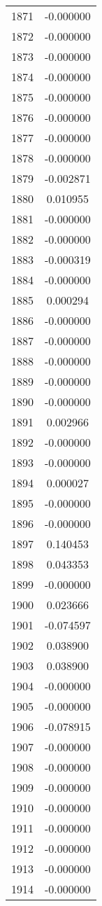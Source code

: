 \documentclass[12pt]{article}
\begin{document}
\begin{longtable}{@{}cc@{}}
1871 & -0.000000 \\
1872 & -0.000000 \\
1873 & -0.000000 \\
1874 & -0.000000 \\
1875 & -0.000000 \\
1876 & -0.000000 \\
1877 & -0.000000 \\
1878 & -0.000000 \\
1879 & -0.002871 \\
1880 & 0.010955 \\
1881 & -0.000000 \\
1882 & -0.000000 \\
1883 & -0.000319 \\
1884 & -0.000000 \\
1885 & 0.000294 \\
1886 & -0.000000 \\
1887 & -0.000000 \\
1888 & -0.000000 \\
1889 & -0.000000 \\
1890 & -0.000000 \\
1891 & 0.002966 \\
1892 & -0.000000 \\
1893 & -0.000000 \\
1894 & 0.000027 \\
1895 & -0.000000 \\
1896 & -0.000000 \\
1897 & 0.140453 \\
1898 & 0.043353 \\
1899 & -0.000000 \\
1900 & 0.023666 \\
1901 & -0.074597 \\
1902 & 0.038900 \\
1903 & 0.038900 \\
1904 & -0.000000 \\
1905 & -0.000000 \\
1906 & -0.078915 \\
1907 & -0.000000 \\
1908 & -0.000000 \\
1909 & -0.000000 \\
1910 & -0.000000 \\
1911 & -0.000000 \\
1912 & -0.000000 \\
1913 & -0.000000 \\
1914 & -0.000000 \\

\end{longtable}
\end{document}

